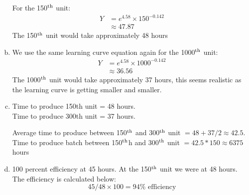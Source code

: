 \documentclass[letterpaper,10pt]{article}
\begin{document}
\begin{enumerate}[a.]
For the 150$^{\mbox{\scriptsize th}}$ unit: 
\begin{align*} 
Y &= e^{4.58} \times 150^{-0.142} \\
&\approx 47.87
\end{align*}
The 150$^{\mbox{\scriptsize th}}$ unit would take approximately 48 hours
\item We use the same learning curve equation again for the 1000$^{\mbox{\scriptsize th}}$ unit:
\begin{align*}
Y &= e^{4.58}\times 1000^{-0.142} \\
&\approx 36.56
\end{align*}
The 1000$^{\mbox{\scriptsize th}}$ unit would take approximately 37 hours, this seems realistic as the learning curve is getting smaller and smaller.
\item Time to produce 150th unit = 48 hours. \\  Time to produce 300th unit = 37 hours.

Average time to produce between 150$^{\mbox{\scriptsize th}}$ and 300$^{\mbox{\scriptsize th}}$ unit $ = 48 +37/2 \approx 42.5 $. \\
Time to produce batch between 150$^{\mbox{\scriptsize th}}$h and 300$^{\mbox{\scriptsize th}}$ unit $= 42.5 * 150 \approx 6375 $ hours
\item 100 percent efficiency at 45 hours.  At the 150$^{\mbox{\scriptsize th}}$ unit we were at 48 hours.  The efficiency is calculated below:
\[ 45/48\times 100 = 94\% \mbox{\ efficiency} \]


\end{enumerate}
\end{document}

